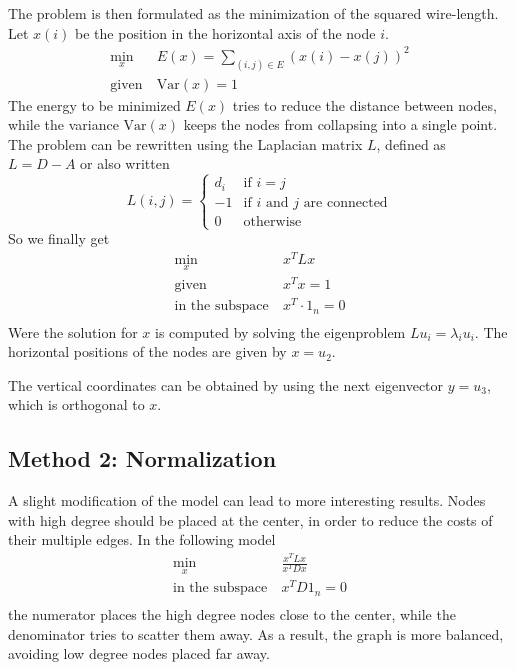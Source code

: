 \documentclass[a4paper,twocolumn]{article}
\begin{document}
The problem is then formulated as the minimization of the squared wire-length.  
Let $x(i)$ be the position in the horizontal axis of the node $i$.
%
\begin{equation}
\begin{split}
\min_x \  & E(x) = \sum_{(i,j) \in E} (x(i) - x(j))^2 \\
\textrm{given} \ & \textrm{Var}(x) = 1
\end{split}
\end{equation}
%
The energy to be minimized $E(x)$ tries to reduce the distance between nodes, 
while the variance $\textrm{Var}(x)$ keeps the nodes from collapsing into a 
single point. The problem can be rewritten using the Laplacian matrix $L$, 
defined as $L = D - A$ or also written
%
\begin{equation}
L(i,j) =
\begin{cases}
	d_i & \text{if $i = j$} \\
	-1 & \text{if $i$ and $j$ are connected} \\
	0 & \text{otherwise}
\end{cases}
\end{equation}
%
So we finally get
%
\begin{equation}
\begin{split}
\min_x \  & x^T L x \\
\textrm{given} \ & x^T x = 1 \\
\textrm{in the subspace} \ & x^T \cdot 1_n = 0 \\
\end{split}
\end{equation}
%
Were the solution for $x$ is computed by solving the eigenproblem $L u_i = 
\lambda_i u_i$. The horizontal positions of the nodes are given by $x = u_2$.

The vertical coordinates can be obtained by using the next eigenvector $y = 
u_3$, which is orthogonal to $x$.

\subsection{Method 2: Normalization}

A slight modification of the model can lead to more interesting results. Nodes 
with high degree should be placed at the center, in order to reduce the costs of 
their multiple edges. In the following model
%
\begin{equation}
\begin{split}
\min_x \  & \frac{x^T L x}{x^T D x} \\
\textrm{in the subspace} \ & x^T D 1_n = 0 \\
\end{split}
\end{equation}
%
the numerator places the high degree nodes close to the center, while the 
denominator tries to scatter them away. As a result, the graph is more balanced, 
avoiding low degree nodes placed far away.
\end{document}
